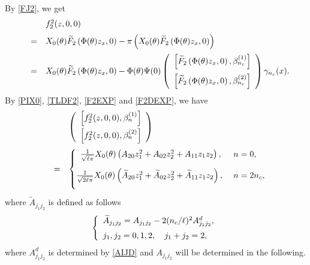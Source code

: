 \documentclass[11pt]{article}
\theoremstyle{definition}
\theoremstyle{remark}
\numberwithin{equation}{section}
\begin{document}
By \eqref{FJ2}, we get
\begin{equation}
\label{F22}
\begin{array}{lll}
&&f_2^2(z,0,0)\vspace{0.2cm}\\
&=&X_0(\theta)\widetilde{F}_2\left(\Phi(\theta) z_x,0\right) -\pi\left(X_0(\theta) \widetilde{F}_2\left(\Phi(\theta) z_x,0\right)\right) \vspace{0.2cm}\\
&=&X_0(\theta)\widetilde{F}_2\left(\Phi(\theta) z_x,0\right) -\Phi (\theta)\Psi (0)\left(\begin{array}{c}\left[\widetilde{F}_2\left(\Phi(\theta) z_x,0\right),\beta_{n_c}^{(1)}\right]\vspace{0.2cm}\\
\left[\widetilde{F}_2\left(\Phi(\theta) z_x,0\right),\beta_{n_c}^{(2)}\right]
\end{array}\right)\gamma_{n_c}(x). \end{array}
\end{equation}
By \eqref{PIX0},  \eqref{TLDF2}, \eqref{F2EXP} and \eqref{F2DEXP}, we have
\begin{equation}\label{EQF22B}
\begin{array}{lll}
 &&
\left(\begin{array}{c}
\left[f_2^2(z,0,0),\beta_n^{(1)}\right]\vspace{0.1cm}\\
\left[f_2^2(z,0,0),\beta_n^{(2)}\right]
\end{array}\right)\vspace{0.2cm}\\
&=&\begin{cases}
\begin{array}{l}
\frac{1}{\sqrt{\ell\pi}} X_0(\theta)\left(A_{20}z_1^2+A_{02}z_2^2+A_{11}z_1z_2\right),
\end{array}
& n=0,\vspace{0.3cm}\\
\frac{1} {\sqrt{2\ell\pi}} X_0(\theta)\left(\widetilde{A}_{20}z_1^2+\widetilde{A}_{02}z_2^2+\widetilde{A}_{11}z_1z_2\right),
&n=2n_c,\vspace{0.3cm}\\
\end{cases}
\end{array}
\end{equation}
where $\widetilde{A}_{j_1j_2} $ is defined as follows
\begin{equation*}
\label{WLDAJ3}
\left\{\begin{array}{l}
\widetilde{A}_{j_1j_2}=A_{j_1j_2}- 2(n_c/\ell)^2A_{j_1j_2}^d,\vspace{0.2cm}\\
j_1, j_2=0, 1, 2, \quad j_1+j_2=2,
\end{array}\right.
\end{equation*}
where  $A_{j_1j_2}^d$ is determined by \eqref{AIJD} and $A_{j_1j_2}$ will be determined in the following.
\end{document}
